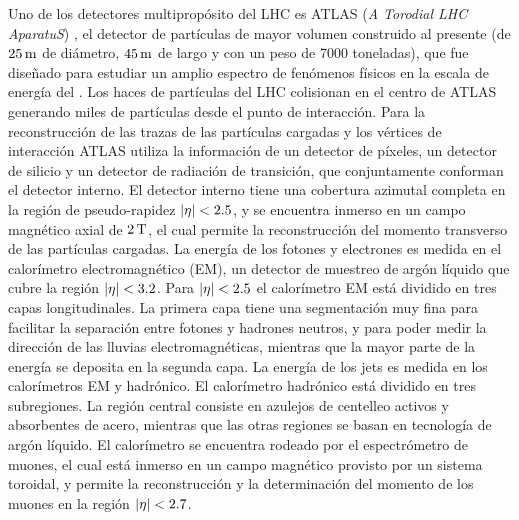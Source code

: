 Uno de los detectores multipropósito del LHC es ATLAS (\emph{A Torodial LHC AparatuS})
\cite{atlas}, el detector de partículas de mayor volumen construido
al presente (de $\unit[25]{m}$ de diámetro, $\unit[45]{m}$ de largo y con un
peso de 7000 toneladas), que fue dise\~nado para estudiar un amplio espectro de
fenómenos físicos en la escala de energía del {\tev}.
Los haces de partículas del LHC colisionan en el centro de ATLAS generando miles
de partículas desde el punto de interacción.
Para la reconstrucción de las trazas de las partículas cargadas y los vértices
de interacción ATLAS utiliza la información de un detector de píxeles, un
detector de silicio y un detector de radiación de transición, que conjuntamente
conforman el detector interno. El detector interno tiene una cobertura azimutal
completa en la región de pseudo-rapidez $\abseta < 2.5$, y se encuentra inmerso
en un campo magnético axial de $\unit[2]{T}$, el cual permite la reconstrucción
del momento transverso de las partículas cargadas.
La energía de los fotones y electrones es medida en el calorímetro
electromagnético (EM), un detector de muestreo de argón líquido que cubre
la región $\abseta < 3.2$. Para $\abseta < 2.5$ el calorímetro EM está dividido en tres
capas longitudinales. La primera capa tiene una segmentación muy fina para
facilitar la separación entre fotones y hadrones neutros, y para poder medir la
dirección de las lluvias electromagnéticas, mientras que la mayor parte de la
energía se deposita en la segunda capa. La energía de
los jets es medida en los calorímetros EM y hadrónico. El calorímetro
hadrónico está dividido en tres subregiones. La región central consiste en azulejos
de centelleo activos y absorbentes de acero, mientras que las otras regiones
se basan en tecnología de argón líquido.
El calorímetro se encuentra rodeado por el espectrómetro de muones, el cual está
inmerso en un campo magnético provisto por un sistema toroidal, y permite la reconstrucción
y la determinación del momento de los muones en la región $\abseta < 2.7$.

